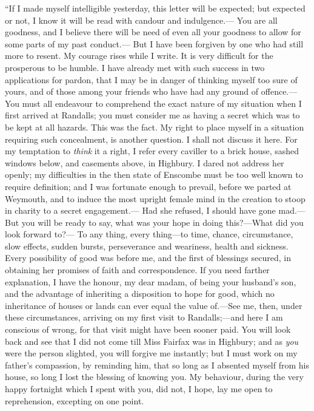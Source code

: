 ``If I made myself intelligible yesterday, this letter will be expected;
but expected or not, I know it will be read with candour and indulgence.---%
You are all goodness, and I believe there will be need of even
all your goodness to allow for some parts of my past conduct.---%
But I have been forgiven by one who had still more to resent.
My courage rises while I write.  It is very difficult for the
prosperous to be humble.  I have already met with such success
in two applications for pardon, that I may be in danger of thinking
myself too sure of yours, and of those among your friends who have
had any ground of offence.---You must all endeavour to comprehend
the exact nature of my situation when I first arrived at Randalls;
you must consider me as having a secret which was to be kept
at all hazards.  This was the fact.  My right to place myself
in a situation requiring such concealment, is another question.
I shall not discuss it here.  For my temptation to \emph{think} it a right,
I refer every caviller to a brick house, sashed windows below,
and casements above, in Highbury.  I dared not address her openly;
my difficulties in the then state of Enscombe must be too well
known to require definition; and I was fortunate enough to prevail,
before we parted at Weymouth, and to induce the most upright female
mind in the creation to stoop in charity to a secret engagement.---%
Had she refused, I should have gone mad.---But you will be ready to say,
what was your hope in doing this?---What did you look forward to?---%
To any thing, every thing---to time, chance, circumstance, slow effects,
sudden bursts, perseverance and weariness, health and sickness.
Every possibility of good was before me, and the first of blessings
secured, in obtaining her promises of faith and correspondence.
If you need farther explanation, I have the honour, my dear madam,
of being your husband's son, and the advantage of inheriting
a disposition to hope for good, which no inheritance of houses
or lands can ever equal the value of.---See me, then, under these
circumstances, arriving on my first visit to Randalls;---and here I
am conscious of wrong, for that visit might have been sooner paid.
You will look back and see that I did not come till Miss Fairfax
was in Highbury; and as \emph{you} were the person slighted, you will
forgive me instantly; but I must work on my father's compassion,
by reminding him, that so long as I absented myself from his house,
so long I lost the blessing of knowing you.  My behaviour,
during the very happy fortnight which I spent with you, did not,
I hope, lay me open to reprehension, excepting on one point.
